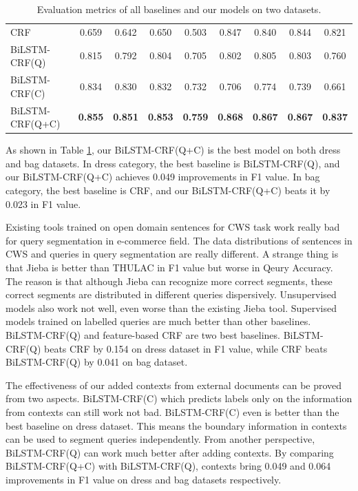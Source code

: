 \begin{table}[h!]
\begin{tabular}{lcccccccc}
		CRF                     & 0.659                     & 0.642                   & 0.650          & 0.503          & 0.847          & 0.840          & 0.844          & 0.821          \\
		BiLSTM-CRF(Q)           & 0.815                     & 0.792                   & 0.804          & 0.705          & 0.802          & 0.805          & 0.803          & 0.760          \\
		\midrule
		BiLSTM-CRF(C)           & 0.834                     & 0.830                   & 0.832          & 0.732          & 0.706          & 0.774          & 0.739          & 0.661          \\
		BiLSTM-CRF(Q+C)         & \textbf{0.855}            & \textbf{0.851}          & \textbf{0.853} & \textbf{0.759} & \textbf{0.868} & \textbf{0.867} & \textbf{0.867} & \textbf{0.837} \\
		\bottomrule
	\end{tabular}
	\caption{Evaluation metrics of all baselines and our models on two datasets.}
	\label{tab:main}
	\vspace{-10pt}
\end{table}

As shown in Table \ref{tab:main}, our BiLSTM-CRF(Q+C) is the best model on both dress and bag datasets. In dress category, the best baseline is BiLSTM-CRF(Q), and our BiLSTM-CRF(Q+C) achieves 0.049 improvements in F1 value. In bag category, the best baseline is CRF, and our BiLSTM-CRF(Q+C) beats it by 0.023 in F1 value.

Existing tools trained on open domain sentences for CWS task work really bad for query segmentation in e-commerce field. The data distributions of sentences in CWS and queries in query segmentation are really different. A strange thing is that Jieba is better than THULAC in F1 value but worse in Qeury Accuracy. The reason is that although Jieba can recognize more correct segments, these correct segments are distributed in different queries dispersively. Unsupervised models also work not well, even worse than the existing Jieba tool. Supervised models trained on labelled queries are much better than other baselines. BiLSTM-CRF(Q) and feature-based CRF are two best baselines. BiLSTM-CRF(Q) beats CRF by 0.154 on dress dataset in F1 value, while CRF beats BiLSTM-CRF(Q) by 0.041 on bag dataset.

The effectiveness of our added contexts from external documents can be proved from two aspects. BiLSTM-CRF(C) which predicts labels only on the information from contexts can still work not bad. BiLSTM-CRF(C) even is better than the best baseline on dress dataset. This means the boundary information in contexts can be used to segment queries independently. From another perspective, BiLSTM-CRF(Q) can work much better after adding contexts. By comparing BiLSTM-CRF(Q+C) with BiLSTM-CRF(Q), contexts bring  0.049 and 0.064 improvements in F1 value on dress and bag datasets respectively.

